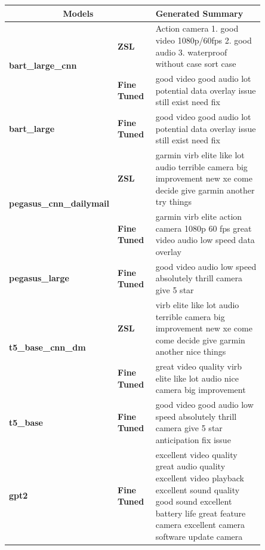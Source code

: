 \documentclass{article}
\begin{document}
\begin{appendices}
\begin{table}[H]
\renewcommand{\arraystretch}{1.5}
	\centering
	\begin{tabular}{p{0.25\linewidth} | p{0.15\linewidth} | p{0.45\linewidth} }
		\hline
		\multicolumn{2}{c|}{\textbf{Models}} & \textbf{Generated Summary}  \\
		\hline
		\multirow{2}{4em}{\textbf{bart\_large\_cnn} } & \textbf{ZSL} & Action camera 1. good video 1080p/60fps 2. good audio 3. waterproof without case sort case  \\
        & \textbf{Fine Tuned}  & good video good audio lot potential data overlay issue still exist need fix\\
        \hline
		\multirow{1}{4em}{\textbf{bart\_large}} & \textbf{Fine Tuned}  & good video good audio lot potential data overlay issue still exist need fix \\
		\hline
	    \multirow{2}{4em}{\textbf{pegasus\_cnn\_dailymail} } & \textbf{ZSL} &  garmin virb elite like lot audio terrible camera big improvement new xe come decide give garmin another try things \\
        & \textbf{Fine Tuned}  & garmin virb elite action camera 1080p 60 fps great video audio low speed data overlay\\
        \hline
		\multirow{1}{4em}{\textbf{pegasus\_large}} & \textbf{Fine Tuned}  & good video audio low speed absolutely thrill camera give 5 star \\
		\hline
		\multirow{2}{4em}{\textbf{t5\_base\_cnn\_dm} } & \textbf{ZSL} & virb elite like lot audio terrible camera big improvement new xe come come decide give garmin another nice things  \\
        & \textbf{Fine Tuned}  & great video quality virb elite like lot audio nice camera big improvement\\
        \hline
		\multirow{1}{4em}{\textbf{t5\_base}} & \textbf{Fine Tuned}  & good video good audio low speed absolutely thrill camera give 5 star anticipation fix issue \\
		\multirow{1}{4em}{\textbf{gpt2}} & \textbf{Fine Tuned}  &  excellent video quality great audio quality excellent video playback excellent sound quality good sound excellent battery life great feature camera excellent camera software update camera \\
		\hline
	\end{tabular}
\end{table}






\end{appendices}
\end{document}
